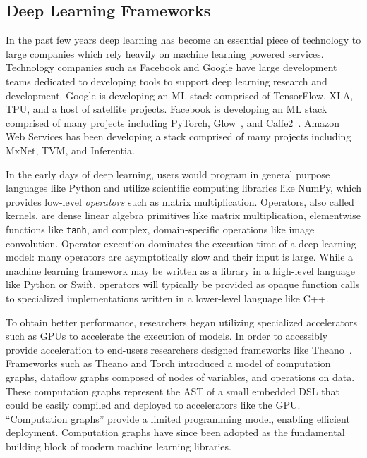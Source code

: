 \subsection{Deep Learning Frameworks}

In the past few years deep learning has become an essential
  piece of technology to large companies which rely heavily
  on machine learning powered services.
Technology companies such as Facebook and Google have large development
  teams dedicated to developing tools to support deep learning research
  and development.
Google is developing an ML stack comprised of
  TensorFlow, XLA, TPU, and a host of satellite projects.
Facebook is developing an ML stack comprised of
  many projects including PyTorch,
  Glow~\citep{glow}, and Caffe2~\citep{pytorch_caffe2}.
Amazon Web Services has been developing a stack
  comprised of many projects including
  MxNet, TVM, and Inferentia.

In the early days of deep learning, users would program
  in general purpose languages like Python and utilize
  scientific computing libraries like NumPy,
  which provides low-level \textit{operators} such as matrix multiplication.
Operators, also called kernels,
  are dense linear algebra primitives like matrix multiplication,
  elementwise functions like \verb|tanh|, and complex,
  domain-specific operations like image convolution.
Operator execution dominates the execution time of a deep learning model: many
  operators are asymptotically slow and their input is large.
While a machine learning framework may be written as a library in a high-level language
  like Python or Swift, operators will typically be provided as opaque function calls to
  specialized implementations written in a lower-level language like C++.

To obtain better performance, researchers began utilizing specialized
  accelerators such as GPUs to accelerate the execution of models.
In order to accessibly provide acceleration to end-users
  researchers designed frameworks like Theano~\citep{theano}.
Frameworks such as Theano and Torch introduced a model of
  computation graphs, dataflow graphs composed of nodes of
    variables, and operations on data.
These computation graphs represent the AST of a small
  embedded DSL that could be easily compiled and deployed
  to accelerators like the GPU.
``Computation graphs'' provide a limited programming model,
    enabling efficient deployment.
Computation graphs have since been adopted as the fundamental building block of modern
    machine learning libraries.

